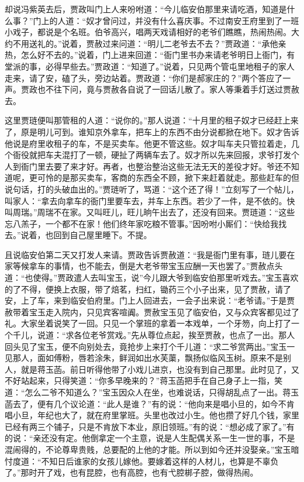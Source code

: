 


\begin{parag}
    却说冯紫英去后，贾政叫门上人来吩咐道：“今儿临安伯那里来请吃酒，知道是什么事？”门上的人道：“奴才曾问过，并没有什么喜庆事。不过南安王府里到了一班小戏子，都说是个名班。伯爷高兴，唱两天戏请相好的老爷们瞧瞧，热闹热闹。大约不用送礼的。”说着，贾赦过来问道：“明儿二老爷去不去？”贾政道：“承他亲热，怎么好不去的。”说着，门上进来回道：“衙门里书办来请老爷明日上衙门，有堂派的事，必得早些去。”贾政道：“知道了。”说着，只见两个管屯里地租子的家人走来，请了安，磕了头，旁边站着。贾政道：“你们是郝家庄的？”两个答应了一声。贾政也不往下问，竟与贾赦各自说了一回话儿散了。家人等秉着手灯送过贾赦去。
\end{parag}


\begin{parag}
    这里贾琏便叫那管租的人道：“说你的。”那人说道：“十月里的租子奴才已经赶上来了，原是明儿可到。谁知京外拿车，把车上的东西不由分说都掀在地下。奴才告诉他说是府里收租子的车，不是买卖车。他更不管这些。奴才叫车夫只管拉着走，几个衙役就把车夫混打了一顿，硬扯了两辆车去了。奴才所以先来回报，求爷打发个人到衙门里去要了来才好。再者，也整治整治这些无法无天的差役才好。爷还不知道呢，更可怜的是那买卖车，客商的东西全不顾，掀下来赶着就走。那些赶车的但说句话，打的头破血出的。”贾琏听了，骂道：“这个还了得！”立刻写了一个帖儿，叫家人：“拿去向拿车的衙门里要车去，并车上东西。若少了一件，是不依的。快叫周瑞。”周瑞不在家。又叫旺儿，旺儿晌午出去了，还没有回来。贾琏道：“这些忘八羔子，一个都不在家！他们终年家吃粮不管事。”因吩咐小厮们：“快给我找去。”说着，也回到自己屋里睡下。不提。
\end{parag}


\begin{parag}
    且说临安伯第二天又打发人来请。贾政告诉贾赦道：“我是衙门里有事，琏儿要在家等候拿车的事情，也不能去，倒是大老爷带宝玉应酬一天也罢了。”贾赦点头道：“也使得。”贾政遣人去叫宝玉，说”今儿跟大爷到临安伯那里听戏去。”宝玉喜欢的了不得，便换上衣服，带了焙茗，扫红，锄药三个小子出来，见了贾赦，请了安，上了车，来到临安伯府里。门上人回进去，一会子出来说：“老爷请。”于是贾赦带着宝玉走入院内，只见宾客喧阗。贾赦宝玉见了临安伯，又与众宾客都见过了礼。大家坐着说笑了一回。只见一个掌班的拿着一本戏单，一个牙笏，向上打了一个千儿，说道：“求各位老爷赏戏。”先从尊位点起，挨至贾赦，也点了一出。那人回头见了宝玉，便不向别处去，竟抢步上来打个千儿道：“求二爷赏两出。”宝玉一见那人，面如傅粉，唇若涂朱，鲜润如出水芙蕖，飘扬似临风玉树。原来不是别人，就是蒋玉菡。前日听得他带了小戏儿进京，也没有到自己那里。此时见了，又不好站起来，只得笑道：“你多早晚来的？”蒋玉菡把手在自己身子上一指，笑道：“怎么二爷不知道么？”宝玉因众人在坐，也难说话，只得胡乱点了一出。蒋玉菡去了，便有几个议论道：“此人是谁？”有的说：“他向来是唱小旦的，如今不肯唱小旦，年纪也大了，就在府里掌班。头里也改过小生。他也攒了好几个钱，家里已经有两三个铺子，只是不肯放下本业，原旧领班。”有的说：“想必成了家了。”有的说：“亲还没有定。他倒拿定一个主意，说是人生配偶关系一生一世的事，不是混闹得的，不论尊卑贵贱，总要配的上他的才能。所以到如今还并没娶亲。”宝玉暗忖度道：“不知日后谁家的女孩儿嫁他。要嫁着这样的人材儿，也算是不辜负了。”那时开了戏，也有昆腔，也有高腔，也有弋腔梆子腔，做得热闹。
\end{parag}


